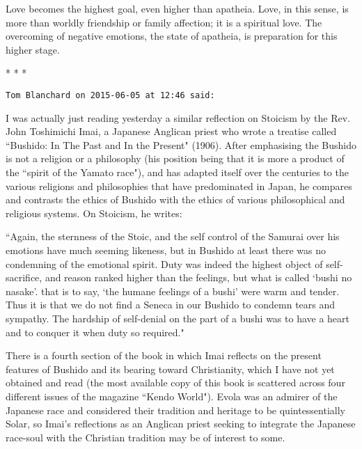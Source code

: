 Love becomes the highest goal, even higher than apatheia. Love, in this sense, is more than worldly friendship or family affection; it is a spiritual love. The overcoming of negative emotions, the state of apatheia, is preparation for this higher stage.



\begin{center}* * *\end{center}

\begin{footnotesize}\begin{sffamily}



\texttt{Tom Blanchard on 2015-06-05 at 12:46 said: }

I was actually just reading yesterday a similar reflection on Stoicism by the Rev. John Toshimichi Imai, a Japanese Anglican priest who wrote a treatise called ``Bushido: In The Past and In the Present" (1906). After emphasising the Bushido is not a religion or a philosophy (his position being that it is more a product of the ``spirit of the Yamato race"), and has adapted itself over the centuries to the various religions and philosophies that have predominated in Japan, he compares and contrasts the ethics of Bushido with the ethics of various philosophical and religious systems. On Stoicism, he writes:

``Again, the sternness of the Stoic, and the self control of the Samurai over his emotions have much seeming likeness, but in Bushido at least there was no condemning of the emotional spirit. Duty was indeed the highest object of self-sacrifice, and reason ranked higher than the feelings, but what is called `bushi no nasake'. that is to say, `the humane feelings of a bushi' were warm and tender. Thus it is that we do not find a Seneca in our Bushido to condemn tears and sympathy. The hardship of self-denial on the part of a bushi was to have a heart and to conquer it when duty so required."

There is a fourth section of the book in which Imai reflects on the present features of Bushido and its bearing toward Christianity, which I have not yet obtained and read (the most available copy of this book is scattered across four different issues of the magazine ``Kendo World"). Evola was an admirer of the Japanese race and considered their tradition and heritage to be quintessentially Solar, so Imai's reflections as an Anglican priest seeking to integrate the Japanese race-soul with the Christian tradition may be of interest to some.


\end{sffamily}\end{footnotesize}
